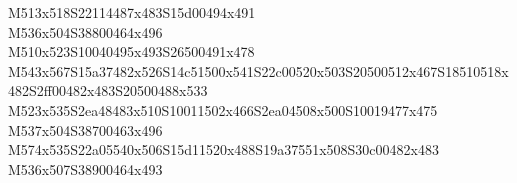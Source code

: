 \documentclass{article}
\begin{document}
\begin{multicols}{5}
\begin{center}
M513x518S22114487x483S15d00494x491 %
\\M536x504S38800464x496 %
\\M510x523S10040495x493S26500491x478 %
\\M543x567S15a37482x526S14c51500x541S22c00520x503S20500512x467S18510518x482S2ff00482x483S20500488x533 %
\\M523x535S2ea48483x510S10011502x466S2ea04508x500S10019477x475 %
\\M537x504S38700463x496 %
\\M574x535S22a05540x506S15d11520x488S19a37551x508S30c00482x483 %
\\M536x507S38900464x493 %
\vfil

\end{center}
\end{multicols}
\end{document}
